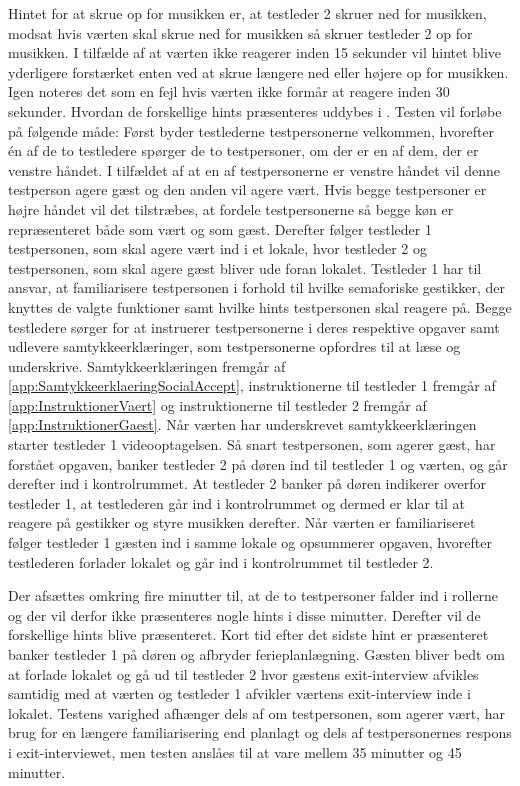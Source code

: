 Hintet for at skrue op for musikken er, at testleder 2 skruer ned for musikken, modsat hvis værten skal skrue ned for musikken så skruer testleder 2 op for musikken. I tilfælde af at værten ikke reagerer inden 15 sekunder vil hintet blive yderligere forstærket enten ved at skrue længere ned eller højere op for musikken. Igen noteres det som en fejl hvis værten ikke formår at reagere inden 30 sekunder. Hvordan de forskellige hints præsenteres uddybes i .\blankline
% 
Testen vil forløbe på følgende måde: Først byder testlederne testpersonerne velkommen, hvorefter én af de to testledere spørger de to testpersoner, om der er en af dem, der er venstre håndet. I tilfældet af at en af testpersonerne er venstre håndet vil denne testperson agere gæst og den anden vil agere vært. Hvis begge testpersoner er højre håndet vil det tilstræbes, at fordele testpersonerne så begge køn er repræsenteret både som vært og som gæst. Derefter følger testleder 1 testpersonen, som skal agere vært ind i et lokale, hvor testleder 2 og testpersonen, som skal agere gæst bliver ude foran lokalet. Testleder 1 har til ansvar, at familiarisere testpersonen i forhold til hvilke semaforiske gestikker, der knyttes de valgte funktioner samt hvilke hints testpersonen skal reagere på. Begge testledere sørger for at instruerer testpersonerne i deres respektive opgaver samt udlevere samtykkeerklæringer, som testpersonerne opfordres til at læse og underskrive. Samtykkeerklæringen fremgår af \autoref{app:SamtykkeerklaeringSocialAccept}, instruktionerne til testleder 1 fremgår af \autoref{app:InstruktionerVaert} og instruktionerne til testleder 2 fremgår af \autoref{app:InstruktionerGaest}. Når værten har underskrevet samtykkeerklæringen starter testleder 1 videooptagelsen. Så snart testpersonen, som agerer gæst, har forstået opgaven, banker testleder 2 på døren ind til testleder 1 og værten, og går derefter ind i kontrolrummet. At testleder 2 banker på døren indikerer overfor testleder 1, at testlederen går ind i kontrolrummet og dermed er klar til at reagere på gestikker og styre musikken derefter. Når værten er familiariseret følger testleder 1 gæsten ind i samme lokale og opsummerer opgaven, hvorefter testlederen forlader lokalet og går ind i kontrolrummet til testleder 2.
 
Der afsættes omkring fire minutter til, at de to testpersoner falder ind i rollerne og der vil derfor ikke præsenteres nogle hints i disse minutter. Derefter vil de forskellige hints blive præsenteret. Kort tid efter det sidste hint er præsenteret banker testleder 1 på døren og afbryder ferieplanlægning. Gæsten bliver bedt om at forlade lokalet og gå ud til testleder 2 hvor gæstens exit-interview afvikles samtidig med at værten og testleder 1 afvikler værtens exit-interview inde i lokalet.\blankline
%
Testens varighed afhænger dels af om testpersonen, som agerer vært, har brug for en længere familiarisering end planlagt og dels af testpersonernes respons i exit-interviewet, men testen anslåes til at vare mellem 35 minutter og 45 minutter. 
%
